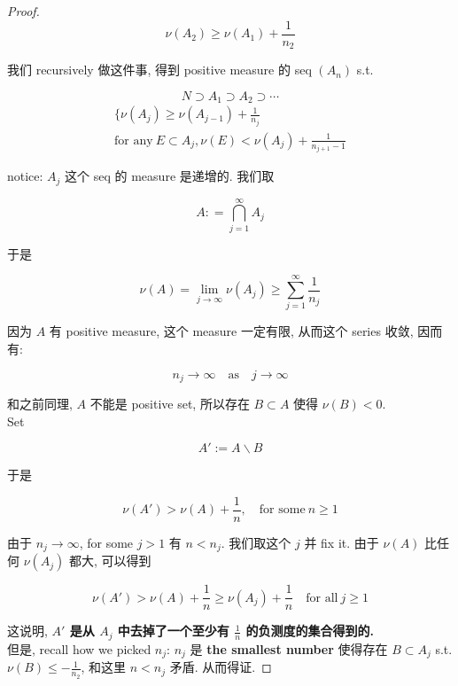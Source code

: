 \documentclass{qlnotes-export}
\begin{document}
\begin{proof}
\[\nu(A_{2}) \geq \nu(A_{1}) + \frac{1}{n_{2}}\]

我们 recursively 做这件事, 得到 positive measure 的 seq \((A_{n})\) s.t.

\[N \supset A_{1} \supset A_{2} \supset \cdots\]\[\begin{matrix}
{\{\nu(A_{j}) \geq \nu(A_{j - 1}) + \frac{1}{n_{j}}} \\
{\text{for any}\ E \subset A_{j},\nu(E) < \nu(A_{j}) + \frac{1}{n_{j + 1} - 1}}
\end{matrix}\]

notice: \(A_{j}\) 这个 seq 的 measure 是递增的. 我们取

\[A: = \bigcap\limits_{j = 1}^{\infty}A_{j}\]

于是

\[\nu(A) = \lim\limits_{j\rightarrow\infty}\nu(A_{j}) \geq \sum\limits_{j = 1}^{\infty}\frac{1}{n_{j}}\]

因为 \(A\) 有 positive measure, 这个 measure 一定有限, 从而这个 series 收敛, 因而有:

\[n_{j}\rightarrow\infty\quad\text{as}\quad j\rightarrow\infty\]

和之前同理, \(A\) 不能是 positive set, 所以存在 \(B \subset A\) 使得 \(\nu(B) < 0\).\\
Set

\[A' := A\backslash B\]

于是

\[\nu(A') > \nu(A) + \frac{1}{n},\quad\text{for some}\ n \geq 1\]

由于 \(n_{j}\rightarrow\infty\), for some \(j > 1\) 有 \(n < n_{j}\). 我们取这个 \(j\) 并 fix it. 由于 \(\nu(A)\) 比任何 \(\nu(A_{j})\) 都大, 可以得到

\[\nu(A') > \nu(A) + \frac{1}{n} \geq \nu(A_{j}) + \frac{1}{n}\quad\text{for all}\ j \geq 1\]

这说明, \textbf{\(A'\) 是从 \(A_{j}\) 中去掉了一个至少有 \(\frac{1}{n}\) 的负测度的集合得到的.}\\
但是, recall how we picked \(n_{j}\): \(n_{j}\) 是 \textbf{the smallest number} 使得存在 \(B \subset A_{j}\) s.t. \(\nu(B) \leq - \frac{1}{n_{2}}\), 和这里 \(n < n_{j}\) 矛盾. 从而得证.

\end{proof}
\end{document}

